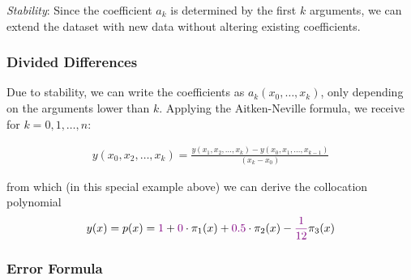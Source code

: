 \emph{Stability}: Since the coefficient $a_k$ is determined by the first $k$ arguments,
we can extend the dataset with new data without altering existing coefficients.

\subsubsection{Divided Differences}

Due to stability, we can write the coefficients as $a_k(x_0,\ldots,x_k)$, only depending on the arguments lower than $k$.
Applying the Aitken-Neville formula, we receive for $k=0,1,\ldots,n$:

\begin{align*}
    y(x_0, x_2, \ldots, x_k)=\frac{y(x_1,x_2,\ldots,x_k) - y(x_0, x_1, \ldots, x_{k-1})}{(x_k - x_0)}
\end{align*}



from which (in this special example above) we can derive the collocation polynomial
\begin{align*}
    y(x)=p(x)={\color{purple}1} + {\color{purple}0}\cdot\pi_1(x) + {\color{purple}0.5}\cdot\pi_2(x)
    - {\color{purple}\frac{1}{12}}\pi_3(x)
\end{align*}

\subsubsection{Error Formula}

